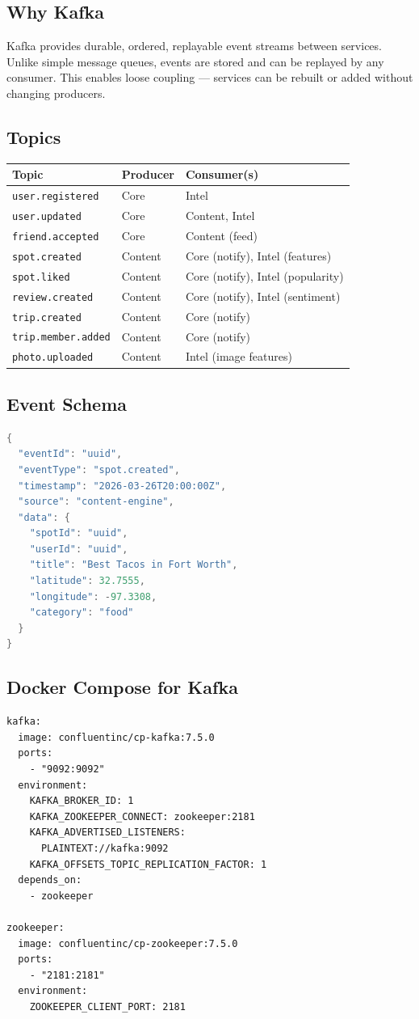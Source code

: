 \documentclass[12pt,letterpaper]{article}
\begin{document}
\subsection{Why Kafka}
Kafka provides durable, ordered, replayable event streams between services. Unlike simple message queues, events are stored and can be replayed by any consumer. This enables loose coupling --- services can be rebuilt or added without changing producers.

\subsection{Topics}
\begin{tabular}{|l|l|l|}
\hline
\textbf{Topic} & \textbf{Producer} & \textbf{Consumer(s)} \\
\hline
\texttt{user.registered} & Core & Intel \\
\texttt{user.updated} & Core & Content, Intel \\
\texttt{friend.accepted} & Core & Content (feed) \\
\texttt{spot.created} & Content & Core (notify), Intel (features) \\
\texttt{spot.liked} & Content & Core (notify), Intel (popularity) \\
\texttt{review.created} & Content & Core (notify), Intel (sentiment) \\
\texttt{trip.created} & Content & Core (notify) \\
\texttt{trip.member.added} & Content & Core (notify) \\
\texttt{photo.uploaded} & Content & Intel (image features) \\
\hline
\end{tabular}

\subsection{Event Schema}
\begin{lstlisting}[style=code,language=Java]
{
  "eventId": "uuid",
  "eventType": "spot.created",
  "timestamp": "2026-03-26T20:00:00Z",
  "source": "content-engine",
  "data": {
    "spotId": "uuid",
    "userId": "uuid",
    "title": "Best Tacos in Fort Worth",
    "latitude": 32.7555,
    "longitude": -97.3308,
    "category": "food"
  }
}
\end{lstlisting}

\subsection{Docker Compose for Kafka}
\begin{lstlisting}[style=code]
kafka:
  image: confluentinc/cp-kafka:7.5.0
  ports:
    - "9092:9092"
  environment:
    KAFKA_BROKER_ID: 1
    KAFKA_ZOOKEEPER_CONNECT: zookeeper:2181
    KAFKA_ADVERTISED_LISTENERS:
      PLAINTEXT://kafka:9092
    KAFKA_OFFSETS_TOPIC_REPLICATION_FACTOR: 1
  depends_on:
    - zookeeper

zookeeper:
  image: confluentinc/cp-zookeeper:7.5.0
  ports:
    - "2181:2181"
  environment:
    ZOOKEEPER_CLIENT_PORT: 2181
\end{lstlisting}
\end{document}
